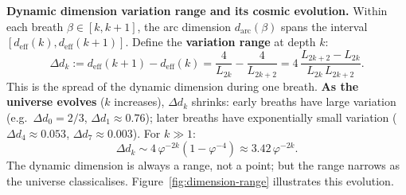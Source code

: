 \documentclass[12pt,a4paper]{article}
\begin{document}
\medskip
\noindent\textbf{Dynamic dimension variation range and its cosmic evolution.} Within each breath $\beta \in [k, k+1]$, the arc dimension $d_{\mathrm{arc}}(\beta)$ spans the interval $[d_{\mathrm{eff}}(k), d_{\mathrm{eff}}(k+1)]$. Define the \textbf{variation range} at depth $k$:
\begin{equation}
\Delta d_k := d_{\mathrm{eff}}(k+1) - d_{\mathrm{eff}}(k) = \frac{4}{L_{2k}} - \frac{4}{L_{2k+2}} = 4\,\frac{L_{2k+2} - L_{2k}}{L_{2k}\,L_{2k+2}}.
\label{eq:dimension-range}
\end{equation}
This is the spread of the dynamic dimension during one breath. \textbf{As the universe evolves} ($k$ increases), $\Delta d_k$ shrinks: early breaths have large variation (e.g.\ $\Delta d_0 = 2/3$, $\Delta d_1 \approx 0.76$); later breaths have exponentially small variation ($\Delta d_4 \approx 0.053$, $\Delta d_7 \approx 0.003$). For $k \gg 1$:
\begin{equation}
\Delta d_k \sim 4\,\varphi^{-2k}\left(1 - \varphi^{-4}\right) \approx 3.42\,\varphi^{-2k}.
\end{equation}
The dynamic dimension is always a range, not a point; but the range narrows as the universe classicalises. Figure~\ref{fig:dimension-range} illustrates this evolution.
\end{document}
